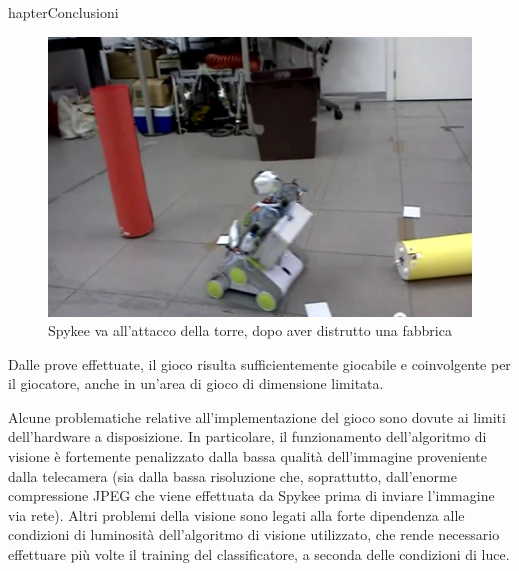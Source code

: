 hapter{Conclusioni}
\label{cap:conclusioni}


\begin{figure}
\centering
\includegraphics[scale=0.7]{images/attaccotorre}
\caption{Spykee va all'attacco della torre, dopo aver distrutto una fabbrica}
\end{figure}

Dalle prove effettuate, il gioco risulta sufficientemente giocabile e coinvolgente per il giocatore, anche in un'area di gioco di dimensione limitata.

Alcune problematiche relative all'implementazione del gioco sono dovute ai limiti dell'hardware a disposizione. In particolare, il funzionamento dell'algoritmo di visione è fortemente penalizzato dalla bassa qualità dell'immagine proveniente dalla telecamera (sia dalla bassa risoluzione che, soprattutto, dall'enorme compressione JPEG che viene effettuata da Spykee prima di inviare l'immagine via rete). Altri problemi della visione sono legati alla forte dipendenza alle condizioni di luminosità dell'algoritmo di visione utilizzato, che rende necessario effettuare più volte il training del classificatore, a seconda delle condizioni di luce.



